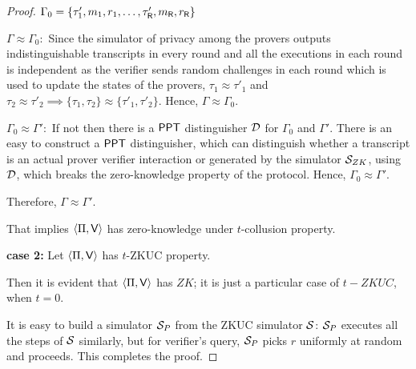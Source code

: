 \begin{proof}
	$\Gamma_0 = \{\tau'_1, m_1 ,r_1, \ldots, \tau'_{\mathsf{R}}, m_{\mathsf{R}}, r_{\mathsf{R}} \}$
	
	$\Gamma \approx \Gamma_0 : $ Since the simulator of privacy among the provers outputs indistinguishable transcripts in every round and all the executions in each round is independent as the verifier sends random challenges in each round which is used to update the states of the provers, $\tau_1 \approx \tau'_1$ and $\tau_2 \approx \tau'_2 \implies \{\tau_1, \tau_2\} \approx \{\tau'_1, \tau'_2\}$. Hence, $\Gamma \approx \Gamma_0$.
	
	$\Gamma_0 \approx \Gamma': $ If not then there is a $\mathsf{PPT}$ distinguisher $\mathcal{D}$ for $\Gamma_0$ and $\Gamma'$. There is an easy to construct a $\mathsf{PPT}$ distinguisher, which can distinguish whether a transcript is an actual prover verifier interaction or generated by the simulator $\mathcal{S}_{ZK}$, using $\mathcal{D}$, which breaks the zero-knowledge property of the protocol. Hence, $\Gamma_0 \approx \Gamma'$.
	
	Therefore, $\Gamma \approx \Gamma'$.
	
	That implies $\langle \Pi,\mathsf{V}\rangle$ has zero-knowledge under $t$-collusion property.
	
	\textbf{case 2:} Let $\langle \Pi,\mathsf{V}\rangle$ has $t$-ZKUC property.
	
	Then it is evident that $\langle \Pi,\mathsf{V}\rangle$ has $ZK$; it is just a particular case of $t-ZKUC$, when $t=0$.
	
	It is easy to build a simulator $\mathcal{S}_P$ from the ZKUC simulator $\mathcal{S}$: $\mathcal{S}_P$ executes all the steps of $\mathcal{S}$ similarly, but for verifier's query, $\mathcal{S}_P$ picks $r$ uniformly at random and proceeds.
	This completes the proof.

\end{proof}


